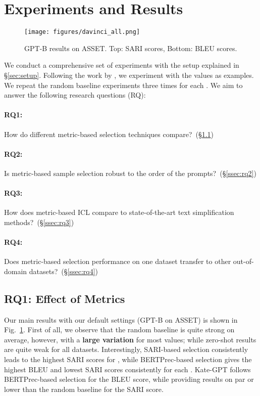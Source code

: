 \documentclass[11pt]{article}
\begin{document}
\section{Experiments and Results}
\begin{figure}[]
    \centering
    \texttt{[image: figures/davinci\_all.png]}
    \caption{GPT-B results on ASSET. Top: SARI scores, Bottom: BLEU scores.}
    \label{fig:davinci_asset_all}
\end{figure}
We conduct a comprehensive set of experiments with the setup explained in \S \ref{sec:setup}. Following the work by \citet{lu-etal-2022-fantastically}, we experiment with the  values as  examples. We repeat the random baseline experiments three times for each . We aim to answer the following research questions (RQ):

\paragraph{RQ1:} How do different metric-based selection techniques compare?~(\S\ref{ssec:rq1})

\paragraph{RQ2:} Is metric-based sample selection robust to the order of the prompts?~(\S\ref{ssec:rq2}) 

\paragraph{RQ3:} How does metric-based ICL compare to state-of-the-art text simplification methods?~(\S\ref{ssec:rq3})

\paragraph{RQ4:} Does metric-based selection performance on one dataset transfer to other out-of-domain datasets?~(\S\ref{ssec:rq4})

\subsection{RQ1: Effect of Metrics} 
\label{ssec:rq1}
Our main results with our default settings (GPT-B on ASSET) is shown in Fig.~\ref{fig:davinci_asset_all}. First of all, we observe that the random baseline is quite strong on average, however, with a \textbf{large variation} for most  values; while zero-shot results are quite weak for all datasets. Interestingly, SARI-based selection consistently leads to the highest SARI scores for , while BERTPrec-based selection gives the highest BLEU and lowest SARI scores consistently for each . Kate-GPT follows BERTPrec-based selection for the BLEU score, while providing results on par or lower than the random baseline for the SARI score. 
\end{document}
